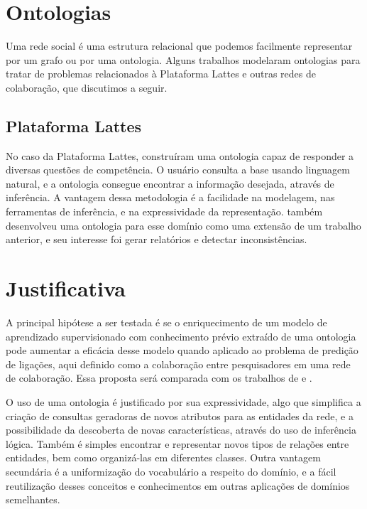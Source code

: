\section{Ontologias}
\label{sec:ontologias}

Uma rede social é uma estrutura relacional que podemos facilmente representar por um grafo ou por uma ontologia. Alguns trabalhos modelaram ontologias para tratar de problemas relacionados à Plataforma Lattes e outras redes de colaboração, que discutimos a seguir.


\subsection{Plataforma Lattes}
\label{ssec:lattes}

No caso da Plataforma Lattes, \citet{Anaue2009} construíram uma ontologia capaz de responder a diversas questões de competência. O usuário consulta a base usando linguagem natural, e a ontologia consegue encontrar a informação desejada, através de inferência. A vantagem dessa metodologia é a facilidade na modelagem, nas ferramentas de inferência, e na
expressividade da representação. \citet{Galego2013} também desenvolveu uma ontologia para esse domínio como uma extensão de um trabalho anterior, e seu interesse foi gerar relatórios e detectar inconsistências.

\section{Justificativa}
\label{sec:justificativa}

A principal hipótese a ser testada é se o enriquecimento de um modelo de aprendizado supervisionado com conhecimento prévio extraído de uma ontologia pode aumentar a eficácia desse modelo quando aplicado ao problema de predição de ligações, aqui definido como a colaboração entre pesquisadores em uma rede de colaboração. Essa proposta será comparada com os trabalhos de \citet{MohammadAlHasan} e \cite{Cervantes2014}.

O uso de uma ontologia é justificado por sua expressividade, algo que simplifica a criação de consultas geradoras de novos atributos para as entidades da rede, e a possibilidade da descoberta de novas características, através do uso de inferência lógica. Também é simples encontrar e representar novos tipos de relações entre entidades, bem como organizá-las em diferentes classes. Outra vantagem secundária é a uniformização do vocabulário a respeito do domínio, e a fácil reutilização desses conceitos e conhecimentos em outras aplicações de domínios semelhantes.

